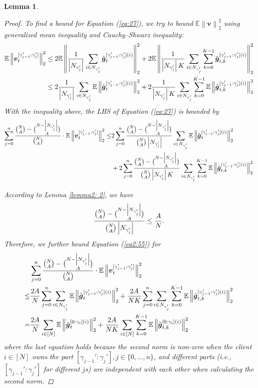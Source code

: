 \documentclass{article}
\theoremstyle{plain}
\newtheorem{lemma}[theorem]{Lemma}
\theoremstyle{definition}
\theoremstyle{remark}
\newcommand{\E}{\mathbb{E}}
\renewcommand{\eqref}[1]{Equation (\ref{#1})}
\newcommand{\norm}[1]{\left\|#1\right\|_2^2}
\begin{document}
\begin{lemma}
\begin{proof}
To find a bound for \eqref{eq:27}, we try to bound $\E\norm{\boldsymbol{v}}$ using generalized mean inequality and Cauchy–Shwarz inequality:
\begin{align}
\E\norm{\boldsymbol{v}_{t}^{[\gamma_{j-1}':\gamma_{j}']}} &\leq 2 \E \norm{\frac{1}{\left|\n{j} \right|} \sum_{i \in \n{j}} \hat{\boldsymbol{g}}^{[\gamma_{j-1}':\gamma_{j}'] (i)}_{t}} + 2 \E \norm{\frac{1}{\left|\n{j} \right| K}  \sum_{i \in \n{j}} \sum_{k=0}^{K-1} \tilde{\boldsymbol{g}}^{[\gamma_{j-1}':\gamma_{j}'] (i)}_{t, k}} \\
&\leq 2 \frac{1}{\left|\n{j} \right|} \sum_{i \in \n{j}} \E\norm{ \hat{\boldsymbol{g}}^{[\gamma_{j-1}':\gamma_{j}'] (i)}_{t} } + 2 \frac{1}{\left|\n{j} \right| K}  \sum_{i \in \n{j}} \sum_{k=0}^{K-1} \E\norm{ \tilde{\boldsymbol{g}}^{[\gamma_{j-1}':\gamma_{j}'] (i)}_{t, k} } \label{eq:29}
\end{align}
With the inequality above, the LHS of \eqref{eq:27} is bounded by
\begin{align}
\sum_{j=0}^n \frac{\binom{N}{A} - \binom{N - \left|\n{j}\right|}{A}}{\binom{N}{A}} \cdot \E\norm{\boldsymbol{v}_{t}^{[\gamma_{j-1}':\gamma_{j}']}} \leq & 2 \sum_{j=0}^n \frac{\binom{N}{A} - \binom{N - \left|\n{j}\right|}{A}}{\binom{N}{A} \left|\n{j} \right|} \sum_{i \in \n{j}} \E \norm{ \hat{\boldsymbol{g}}^{[\gamma_{j-1}':\gamma_{j}'] (i)}_{t} } \\
& + 2 \sum_{j=0}^n \frac{\binom{N}{A} - \binom{N - \left|\n{j}\right|}{A}}{\binom{N}{A} \left|\n{j} \right| K} \sum_{i \in \n{j}} \sum_{k=0}^{K-1} \E \norm{ \tilde{\boldsymbol{g}}^{[\gamma_{j-1}':\gamma_{j}'] (i)}_{t, k} } \label{eq2:55}
\end{align}

According to Lemma \ref{lemma2: 2}, we have
\begin{align}
\frac{\binom{N}{A} - \binom{N - \left|N_{\gamma_{j}'}\right|}{A}}{\binom{N}{A} \left|N_{\gamma_{j}'} \right|} \leq \frac{A}{N}.
\end{align}
Therefore, we further bound \eqref{eq2:55} for 
\begin{align}
&\sum_{j=0}^n \frac{\binom{N}{A} - \binom{N - \left|\n{j}\right|}{A}}{\binom{N}{A}} \cdot \E\norm{\boldsymbol{v}_{t}^{[\gamma_{j-1}':\gamma_{j}']}} \\
\leq & \frac{2A}{N} \sum_{j=0}^n \sum_{i \in \n{j}} \E \norm{ \hat{\boldsymbol{g}}^{[\gamma_{j-1}':\gamma_{j}'] (i)}_{t} } + \frac{2A}{N K} \sum_{j=0}^n \sum_{i \in \n{j}} \sum_{k=0}^{K-1} \E \norm{ \tilde{\boldsymbol{g}}^{[\gamma_{j-1}':\gamma_{j}'] (i)}_{t, k} } \\
= & \frac{2A}{N} \sum_{i \in [N]} \E\norm{ \hat{\boldsymbol{g}}^{[0:\gamma_{i}] (i)}_{t} } + \frac{2A}{NK} \sum_{i \in [N]} \sum_{k=0}^{K-1} \E\norm{ \tilde{\boldsymbol{g}}^{[0:\gamma_{i}] (i)}_{t, k} } \label{eq2:59}
\end{align}
where the last equation holds because the second norm is non-zero when the client $i \in [N]$ owns the part $[\gamma_{j-1}':\gamma_{j}'], j\in\{0, \dots, n\}$, and different parts (i.e., $[\gamma_{j-1}':\gamma_{j}']$ for different $j$s) are independent with each other when calculating the second norm. 


\end{proof}
\end{lemma}
\end{document}

